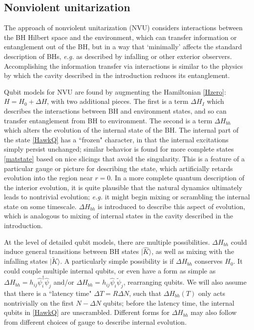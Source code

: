 \documentclass[12pt]{article}
\numberwithin{equation}{section}
\begin{document}
\subsection{Nonviolent unitarization}

The approach of nonviolent unitarization \cite{SGmodels,NVNL,NVUEFT,NVNLT,NVU,BHQU} (NVU)  considers interactions between the BH Hilbert space and the environment, which can transfer information or entanglement out of the BH, but in a way that `minimally' affects the standard description of BHs, {\it e.g.} as described by infalling or other exterior observers.  Accomplishing the information transfer via interactions is similar to the physics by which the cavity described in the introduction reduces its entanglement.

Qubit models for NVU are found by augmenting the Hamiltonian \eqref{Hzero}: $H=H_0+\Delta H$, with two additional pieces.  The first is a term $\Delta H_I$ which describes the interactions between BH and environment states, and so can transfer entanglement from BH to environment.  The second is a term $\Delta H_{bh}$ which alters the evolution of the internal state of the BH.  The internal part of the state \eqref{HawkQ} has a ``frozen" character, in that the internal excitations simply persist unchanged; similar behavior is found for more complete states \eqref{matstate} based on nice slicings that avoid the singularity\cite{SEHS,SE2d,GiPe1}.  This is a feature of a particular gauge or picture for describing the state, which artificially retards evolution into the region near $r=0$.  In a more complete quantum description of the interior evolution, it is quite plausible that the natural dynamics ultimately leads to nontrivial evolution; {\it e.g.} it might begin mixing or scrambling the internal state on some timescale.  $\Delta H_{bh}$ is introduced to describe this aspect of evolution, which is analogous to mixing of internal states in the cavity described in the introduction.

At the level of detailed qubit models, there are multiple possibilities.  $\Delta H_{bh}$ could induce general transitions  between BH states $|\hat K\rangle$, as well as mixing with the infalling states 
 $|\tilde K\rangle$.  A particularly simple possibility is if $\Delta H_{bh}$ conserves $H_0$.  It could couple multiple internal qubits, or even have a form as simple as $\Delta H_{bh}=h_{ij} \hat \psi^\dagger_i \hat \psi_j$ and/or $\Delta H_{bh}=h_{ij} \hat \psi_i \tilde \psi_j$, rearranging qubits.  We will also assume that there is a ``latency time" $\Delta T= R\Delta N$, such that $\Delta H_{bh}(T)$ only acts nontrivially on the first $N-\Delta N$ qubits; before the latency time, the internal qubits in \eqref{HawkQ} are unscrambled.  Different forms for $\Delta H_{bh}$ may also follow from different choices of gauge to describe internal evolution.  
\end{document}
